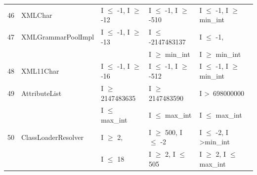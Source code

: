 \documentclass[runningheads,a4paper]{llncs}
\begin{document}
{\begin{longtable}{|l|l|l|l|l|}
46	& XMLChar					& I $\le$ -1, I $\ge$ -12			& I $\le$ -1, I $\ge$ -510			& I $\le$ -1, I $\ge$ min\_int	\\
47	& XMLGrammarPoolImpl		& I $\le$ -1, I $\ge$ -13			& I $\le$ -2147483137 			& I $\le$ -1, 							\\ 
	&							&								& I $\ge$ min\_int				& I $\ge$ min\_int				\\
48	& XML11Char				& I $\le$ -1, I $\ge$ -16			& I $\le$ -1, I $\ge$ -512			& I $\le$ -1, I $\ge$ min\_int	\\ 
49	& AttributeList				& I $\ge$ 2147483635			& I $\ge$ 2147483590			& I \textgreater~698000000					\\ 
	&                                             & I $\le$ max\_int					& I $\le$ max\_int					& I $\le$ max\_int				\\
50	& ClassLoaderResolver		&  I $\ge$ 2,						& I $\ge$ 500, I $\le$ -2			& I $\le$ -2, I \textgreater min\_int  	\\ 
	& \label{table:stripDomains7}  &  I $\le$ 18						& I $\ge$ 2, I $\le$ 505			& I $\ge$ 2, I $\le$ max\_int	\\ \hline
	
\end{longtable}
}
\end{document}
